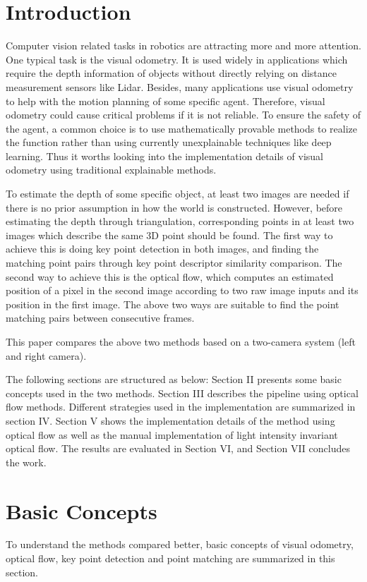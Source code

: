 \documentclass{easychair}
\begin{document}
\section{Introduction}
Computer vision related tasks in robotics are attracting more and more attention. One typical task is the visual odometry. It is used widely in applications which require the depth information of objects without directly relying on distance measurement sensors like Lidar. Besides, many applications use visual odometry to help with the motion planning of some specific agent. Therefore, visual odometry could cause critical problems if it is not reliable. To ensure the safety of the agent, a common choice is to use mathematically provable methods to realize the function rather than using currently unexplainable techniques like deep learning. Thus it worths looking into the implementation details of visual odometry using traditional explainable methods.

To estimate the depth of some specific object, at least two images are needed if there is no prior assumption in how the world is constructed. However, before estimating the depth through triangulation, corresponding points in at least two images which describe the same 3D point should be found. The first way to achieve this is doing key point detection in both images, and finding the matching point pairs through key point descriptor similarity comparison. The second way to achieve this is the optical flow, which computes an estimated position of a pixel in the second image according to two raw image inputs and its position in the first image. The above two ways are suitable to find the point matching pairs between consecutive frames. 

This paper compares the above two methods based on a two-camera system (left and right camera).

The following sections are structured as below: Section II presents some basic concepts used in the two methods. Section III describes the pipeline using optical flow methods. Different strategies used in the implementation are summarized in section IV. Section V shows the implementation details of the method using optical flow as well as the manual implementation of light intensity invariant optical flow. The results are evaluated in Section VI, and Section VII concludes the work.


\section{Basic Concepts}
To understand the methods compared better, basic concepts of visual odometry, optical flow, key point detection and point matching are summarized in this section.
\end{document}
